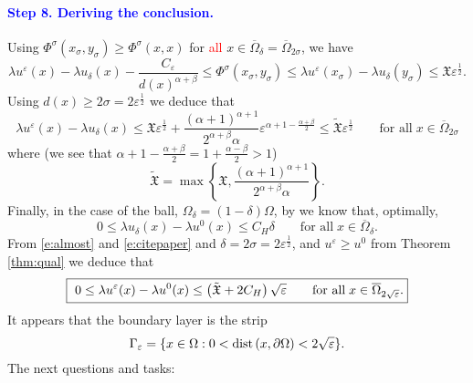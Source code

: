\documentclass[11pt,reqno]{amsart}
\numberwithin{figure}{section}
\theoremstyle{plain}
\theoremstyle{remark}
\numberwithin{equation}{section}
\newcommand{\dist}{{\rm dist}\,}
\begin{document}
\paragraph{\textcolor{blue}{\textbf{Step 8. Deriving the conclusion}.}} Using $\Phi^\sigma(x_\sigma,y_\sigma)\geq \Phi^\sigma(x,x)$ for \textcolor{red}{all} $x\in \overline{\Omega}_\delta =  \overline{\Omega}_{2\sigma}$, we have
\begin{equation*}
    \lambda u^\varepsilon(x) - \lambda u_\delta(x) - \frac{C_\varepsilon}{d(x)^{\alpha+\beta}} \leq \Phi^\sigma(x_\sigma,y_\sigma) \leq \lambda u^\varepsilon(x_\sigma) - \lambda u_\delta(y_\sigma) \leq \mathfrak{X}\varepsilon^\frac{1}{2}.
\end{equation*}
Using $d(x)\geq 2\sigma = 2\varepsilon^{\frac{1}{2}}$ we deduce that
\begin{equation}\label{e:almost}
    \lambda u^\varepsilon(x) - \lambda u_\delta(x) \leq \mathfrak{X}\varepsilon^\frac{1}{2} + \frac{(\alpha+1)^{\alpha+1}}{2^{\alpha+\beta}\alpha}\varepsilon^{\alpha+1 - \frac{\alpha+\beta}{2}} \leq \tilde{\mathfrak{X}}\varepsilon^\frac{1}{2} \qquad \text{for all}\;x\in \overline{\Omega}_{2\sigma}
\end{equation}
where (we see that $\alpha+1 - \frac{\alpha+\beta}{2} = 1+ \frac{\alpha-\beta}{2} > 1$)
\begin{equation*}
    \tilde{\mathfrak{X}} = \max \left\lbrace\mathfrak{X}, \frac{(\alpha+1)^{\alpha+1}}{2^{\alpha+\beta}\alpha} \right\rbrace.
\end{equation*}
Finally, in the case of the ball, $\Omega_\delta = (1-\delta)\Omega$, by \cite[Theorem 1.5]{kim_state-constraint_2020} we know that, optimally,
\begin{equation}\label{e:citepaper}
    0\leq \lambda u_\delta(x) - \lambda u^0(x)\leq C_H\delta \qquad\text{for all}\; x\in \overline{\Omega}_\delta.
\end{equation}
From \eqref{e:almost} and \eqref{e:citepaper} and $\delta =2\sigma= 2\varepsilon^\frac{1}{2}$, and $u^\varepsilon \geq u^0$ from Theorem \ref{thm:qual} we deduce that
\begin{align*}
    \fbox{ $\displaystyle 0 \leq \lambda u^\varepsilon(x) - \lambda u^0(x) \leq \left(\tilde{\mathfrak{X}} + 2C_H\right)\sqrt{\varepsilon} \qquad\text{for all}\; x\in \overline{\Omega}_{2\sqrt{\varepsilon}}$.}
\end{align*}
It appears that the boundary layer is the strip
\begin{equation*}
    \Gamma_\varepsilon = \{x\in \Omega: 0<\mathrm\dist(x,\partial\Omega)< 2\sqrt{\varepsilon}\}.
\end{equation*}
The next questions and tasks:
\end{document}
